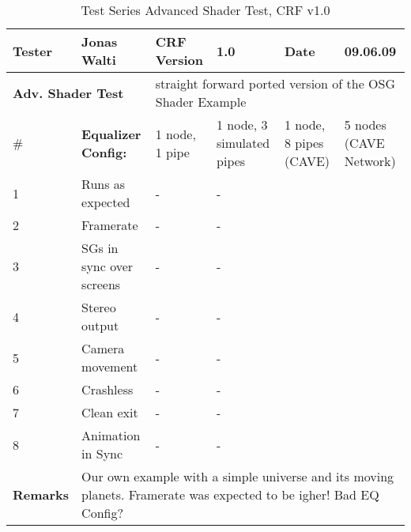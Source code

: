 \begin{table}[H]
	\centering
	\begin{tabular}{|b{}|b{}|m{}|m{}|m{}|m{}|}
		\hline
		\bfseries Tester & Jonas Walti & \bfseries CRF Version & 1.0 & \bfseries Date & 09.06.09 \\
		\hline
		\hline
		\multicolumn{2}{|l|}{\large{\bfseries Adv. Shader Test}} & \multicolumn{4}{p{0.6\textwidth}|}{straight forward ported version of the OSG Shader Example} \\
		\hline
		\hline
		\# & \bfseries Equalizer Config: & 1 node, 1 pipe & 1 node, 3 simulated pipes &  1 node, 8 pipes (CAVE) &  5 nodes (CAVE Network) \\
		\hline 1 & Runs as expected & \quad\quad- & \quad\quad- & \tick & \tick \\
		\hline 2 & Framerate & \quad\quad- & \quad\quad- & \quad\quad 60 & \quad\quad 250 \\
		\hline 3 & SGs in sync over screens & \quad\quad- & \quad\quad- & \tick & \tick \\
		\hline 4 & Stereo output & \quad\quad- & \quad\quad- & \tick & \tick \\
		\hline 5 & Camera movement & \quad\quad- & \quad\quad- & \tick & \tick\\
		\hline 6 & Crashless & \quad\quad- & \quad\quad- & \tick & \tick\\
		\hline 7 & Clean exit & \quad\quad- & \quad\quad- & \tick & \tick \\
		\hline 8 & Animation in Sync & \quad\quad- & - & \tick & \tick \\
		\hline
		\hline \bfseries Remarks & \multicolumn{5}{p{0.85\textwidth}|}{Our own example with a simple universe and its moving planets. Framerate was expected to be igher! Bad EQ Config?}\\
		\hline
	\end{tabular}
	\caption{Test Series Advanced Shader Test, CRF v1.0}
\end{table}


